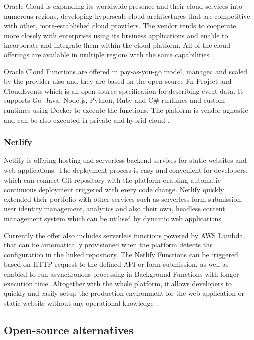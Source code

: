 Oracle Cloud is expanding its worldwide presence and their cloud services into numerous regions, developing hyperscale cloud architectures that are competitive with other, more-established cloud providers. The vendor tends to cooperate more closely with enterprises using its business applications and enable to incorporate and integrate them within the cloud platform. All of the cloud offerings are available in multiple regions with the same capabilities \cite{Gartner}.

Oracle Cloud Functions are offered in pay-as-you-go model, managed and scaled by the provider also and they are based on the open-source Fn Project and CloudEvents which is an open-source specification for describing event data. It supports Go, Java, Node.js, Python, Ruby and C\# runtimes and custom runtimes using Docker to execute the functions. The platform is vendor-agnostic and can be also executed in private and hybrid cloud \cite{FnProject}.

\subsubsection*{Netlify}

Netlify is offering hosting and serverless backend services for static websites and web applications. The deployment process is easy and convenient for developers, which can connect Git repository with the platform enabling automatic continuous deployment triggered with every code change. Netlify quickly extended their portfolio with other services such as serverless form submission, user identity management, analytics and also their own, headless content management system which can be utilised by dynamic web applications.

Currently the offer also includes serverless functions powered by AWS Lambda, that can be automatically provisioned when the platform detects the configuration in the linked repository. The Netlify Functions can be triggered based on HTTP request to the defined API or form submission, as well as enabled to run asynchronous processing in Background Functions with longer execution time. Altogether with the whole platform, it allows developers to quickly and easily setup the production environment for the web application or static website without any operational knowledge \cite{NetlifyFunction}.

\subsection{Open-source alternatives}

